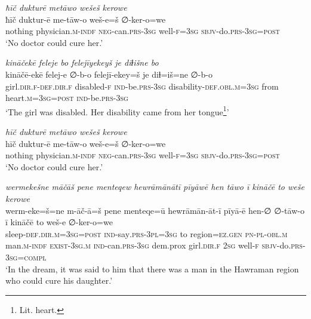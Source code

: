 \ea \label{ŽP.147}
\textit{ħīč dukturē metāwo wešeš kerowe} \\ 
\gll ħīč duktur-ē me-tāw-o weš-e=š ∅-ker-o=we \\ 
 nothing physician\textsc{.m}\textsc{-indf} \textsc{neg-}can\textsc{.prs}\textsc{-3sg} well\textsc{-f}\textsc{=3sg} \textsc{sbjv-}do\textsc{.prs}\textsc{-3sg}\textsc{=\textsc{post}} \\ 
\glt `No doctor could cure her.'
\z 
 
\ea \label{ŽP.149}
\textit{kināčekē feleje bo felejīyekeyš je diɫišne bo} \\ 
\gll kināčē-ekē felej-e ∅-b-o felejī-ekey=š je diɫ=iš=ne ∅-b-o \\ 
 girl\textsc{.dir}\textsc{.f}\textsc{-def}\textsc{.dir}\textsc{.f} disabled\textsc{-f} \textsc{ind-}be\textsc{.prs}\textsc{-3sg} disability\textsc{-def}\textsc{.obl}\textsc{.m}\textsc{=3sg} from heart\textsc{.m}\textsc{=3sg}\textsc{=\textsc{post}} \textsc{ind-}be\textsc{.prs}\textsc{-3sg} \\ 
\glt `The girl was disabled. Her disability came from her tongue\footnote{Lit. heart.}'
\z 
 
\ea \label{ŽP.152}
\textit{hīč dukturē metāwo wešeš kerowe} \\ 
\gll hīč duktur-ē me-tāw-o weš-e=š ∅-ker-o=we \\ 
 nothing physician\textsc{.m}\textsc{-indf} \textsc{neg-}can\textsc{.prs}\textsc{-3sg} well\textsc{-f}\textsc{=3sg} \textsc{sbjv-}do\textsc{.prs}\textsc{-3sg}\textsc{=\textsc{post}} \\ 
\glt `No doctor could cure her.'
\z 
 
\ea \label{ŽP.154}
\textit{wermekešne māčāš pene menteqew hewrāmānātī pīyāwē hen tāwo ī kināčē to weše kerowe} \\ 
\gll werm-eke=š=ne m-āč-ā=š pene menteqe=ū hewrāmān-āt-ī pīyā-ē hen-∅ ∅-tāw-o ī kināčē to weš-e ∅-ker-o=we \\ 
 sleep\textsc{-def}\textsc{.dir}\textsc{.m}\textsc{=3sg}\textsc{=\textsc{post}} \textsc{ind-}say\textsc{.prs}\textsc{-3pl}\textsc{=3sg} to region=\textsc{ez.gen} \textsc{pn}\textsc{\textsc{-pl}}\textsc{-obl}\textsc{.m} man\textsc{.m}\textsc{-indf} \textsc{exist}\textsc{-3sg}\textsc{.m} \textsc{ind-}can\textsc{.prs}\textsc{-3sg} dem.prox girl\textsc{.dir}\textsc{.f} \textsc{2sg} well\textsc{-f} \textsc{sbjv-}do\textsc{.prs}\textsc{-3sg}\textsc{=compl} \\ 
\glt `In the dream, it was said to him that there was a man in the Hawraman region who could cure his daughter.'
\z 
 
